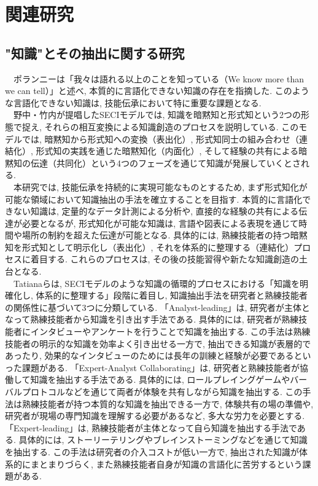 \chapter{関連研究}
\section{"知識"とその抽出に関する研究}
　ポランニーは「我々は語れる以上のことを知っている（We know more than we can tell）」と述べ, 本質的に言語化できない知識の存在を指摘した\cite{Polanyi1966}. このような言語化できない知識は, 技能伝承において特に重要な課題となる.\\

　野中・竹内が提唱したSECIモデルでは, 知識を暗黙知と形式知という2つの形態で捉え, それらの相互変換による知識創造のプロセスを説明している\cite{Nonaka1996}. このモデルでは, 暗黙知から形式知への変換（表出化）, 形式知同士の組み合わせ（連結化）, 形式知の実践を通じた暗黙知化（内面化）, そして経験の共有による暗黙知の伝達（共同化）という4つのフェーズを通じて知識が発展していくとされる.\\

　本研究では, 技能伝承を持続的に実現可能なものとするため, まず形式知化が可能な領域において知識抽出の手法を確立することを目指す. 本質的に言語化できない知識は, 定量的なデータ計測による分析や, 直接的な経験の共有による伝達が必要となるが, 形式知化が可能な知識は, 言語や図表による表現を通じて時間や場所の制約を超えた伝達が可能となる. 具体的には, 熟練技能者の持つ暗黙知を形式知として明示化し（表出化）, それを体系的に整理する（連結化）プロセスに着目する. これらのプロセスは, その後の技能習得や新たな知識創造の土台となる.\\

　Tatianaらは, SECIモデルのような知識の循環的プロセスにおける「知識を明確化し, 体系的に整理する」段階に着目し, 知識抽出手法を研究者と熟練技能者の関係性に基づいて3つに分類している\cite{Tatiana2012}. 「Analyst-leading」は, 研究者が主体となって熟練技能者から知識を引き出す手法である. 具体的には, 研究者が熟練技能者にインタビューやアンケートを行うことで知識を抽出する. この手法は熟練技能者の明示的な知識を効率よく引き出せる一方で, 抽出できる知識が表層的であったり, 効果的なインタビューのためには長年の訓練と経験が必要であるといった課題がある. 「Expert-Analyst Collaborating」は, 研究者と熟練技能者が協働して知識を抽出する手法である. 具体的には, ロールプレイングゲームやバーバルプロトコルなどを通じて両者が体験を共有しながら知識を抽出する. この手法は熟練技能者が持つ本質的な知識を抽出できる一方で, 体験共有の場の準備や, 研究者が現場の専門知識を理解する必要があるなど, 多大な労力を必要とする. 「Expert-leading」は, 熟練技能者が主体となって自ら知識を抽出する手法である. 具体的には, ストーリーテリングやブレインストーミングなどを通じて知識を抽出する. この手法は研究者の介入コストが低い一方で, 抽出された知識が体系的にまとまりづらく, また熟練技能者自身が知識の言語化に苦労するという課題がある.\\

